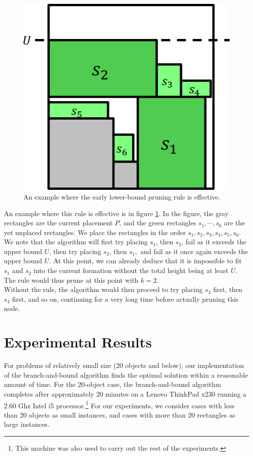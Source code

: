 \documentclass{article}
\begin{document}
\begin{figure}[!h]
  \centering
  \includegraphics[width=.4\linewidth]{diagrams/earlylowerbounds.png}
  \caption{An example where the early lower-bound pruning rule is effective.}
  \label{fig:earlylowerbounds}
\end{figure}

An example where this rule is effective is in figure \ref{fig:earlylowerbounds}. In the figure, the gray rectangles are the current placement $P$, and the green rectangles $s_1,\cdots,s_6$ are the yet unplaced rectangles. We place the rectangles in the order $s_1,s_2,s_3,s_4,s_5,s_6$. We note that the algorithm will first try placing $s_1$, then $s_2$, fail as it exceeds the upper bound $U$, then try placing $s_2$, then $s_1,$ and fail as it once again exceeds the upper bound $U$. At this point, we can already deduce that it is impossible to fit $s_1$ and $s_2$ into the current formation without the total height being at least $U$. The rule would thus prune at this point with $k = 2$.\\

Without the rule, the algorithm would then proceed to try placing $s_3$ first, then $s_4$ first, and so on, continuing for a very long time before actually pruning this node.

\section{Experimental Results}
For problems of relatively small size (20 objects and below), our implementation of the branch-and-bound algorithm finds the optimal solution within a reasonable amount of time. For the 20-object case, the branch-and-bound algorithm completes after approximately 20 minutes on a Lenovo ThinkPad x230 running a 2.60 Ghz Intel i5 processor.\footnote{This machine was also used to carry out the rest of the experiments.} For our experiments, we consider cases with less than 20 objects as small instances, and cases with more than 20 rectangles as large instances.
\end{document}
